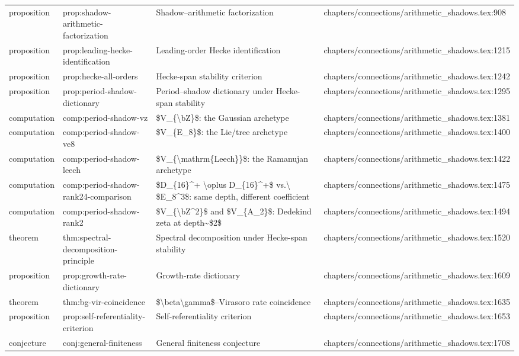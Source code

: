 \documentclass[11pt]{article}
\begin{document}
\begin{longtable}{L{0.10\textwidth}L{0.26\textwidth}L{0.42\textwidth}L{0.22\textwidth}}
proposition & prop:shadow-arithmetic-factorization & Shadow--arithmetic factorization & chapters/connections/arithmetic\_shadows.tex:908\\
proposition & prop:leading-hecke-identification & Leading-order Hecke identification & chapters/connections/arithmetic\_shadows.tex:1215\\
proposition & prop:hecke-all-orders & Hecke-span stability criterion & chapters/connections/arithmetic\_shadows.tex:1242\\
proposition & prop:period-shadow-dictionary & Period--shadow dictionary under Hecke-span stability & chapters/connections/arithmetic\_shadows.tex:1295\\
computation & comp:period-shadow-vz & \$V\_\{\textbackslash{}bZ\}\$: the Gaussian archetype & chapters/connections/arithmetic\_shadows.tex:1381\\
computation & comp:period-shadow-ve8 & \$V\_\{E\_8\}\$: the Lie/tree archetype & chapters/connections/arithmetic\_shadows.tex:1400\\
computation & comp:period-shadow-leech & \$V\_\{\textbackslash{}mathrm\{Leech\}\}\$: the Ramanujan archetype & chapters/connections/arithmetic\_shadows.tex:1422\\
computation & comp:period-shadow-rank24-comparison & \$D\_\{16\}\textasciicircum{}+ \textbackslash{}oplus D\_\{16\}\textasciicircum{}+\$ vs.\textbackslash{} \$E\_8\textasciicircum{}3\$: same depth, different coefficient & chapters/connections/arithmetic\_shadows.tex:1475\\
computation & comp:period-shadow-rank2 & \$V\_\{\textbackslash{}bZ\textasciicircum{}2\}\$ and \$V\_\{A\_2\}\$: Dedekind zeta at depth\textasciitilde{}\$2\$ & chapters/connections/arithmetic\_shadows.tex:1494\\
theorem & thm:spectral-decomposition-principle & Spectral decomposition under Hecke-span stability & chapters/connections/arithmetic\_shadows.tex:1520\\
proposition & prop:growth-rate-dictionary & Growth-rate dictionary & chapters/connections/arithmetic\_shadows.tex:1609\\
theorem & thm:bg-vir-coincidence & \$\textbackslash{}beta\textbackslash{}gamma\$--Virasoro rate coincidence & chapters/connections/arithmetic\_shadows.tex:1635\\
proposition & prop:self-referentiality-criterion & Self-referentiality criterion & chapters/connections/arithmetic\_shadows.tex:1653\\
conjecture & conj:general-finiteness & General finiteness conjecture & chapters/connections/arithmetic\_shadows.tex:1708\\

\end{longtable}
\end{document}
